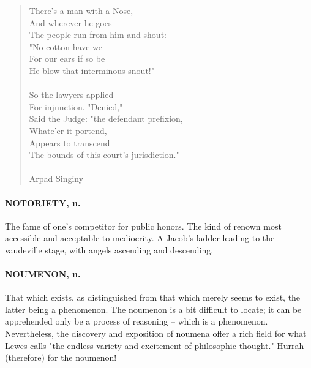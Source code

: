 \documentclass[11pt]{article}
\begin{document}
\begin{quote}       There's a man with a Nose, \\
      And wherever he goes \\
  The people run from him and shout: \\
      "No cotton have we \\
      For our ears if so be \\
  He blow that interminous snout!" \\
 \\
      So the lawyers applied \\
      For injunction.  "Denied," \\
  Said the Judge:  "the defendant prefixion, \\
      Whate'er it portend, \\
      Appears to transcend \\
  The bounds of this court's jurisdiction." \\
 \\
Arpad Singiny \end{quote}


\paragraph{NOTORIETY, n.}  The fame of one's competitor for public honors.  The
kind of renown most accessible and acceptable to mediocrity.  A
Jacob's-ladder leading to the vaudeville stage, with angels ascending
and descending.

\paragraph{NOUMENON, n.}  That which exists, as distinguished from that which
merely seems to exist, the latter being a phenomenon.  The noumenon is
a bit difficult to locate; it can be apprehended only be a process of
reasoning -- which is a phenomenon.  Nevertheless, the discovery and
exposition of noumena offer a rich field for what Lewes calls "the
endless variety and excitement of philosophic thought."  Hurrah
(therefore) for the noumenon!
\end{document}
